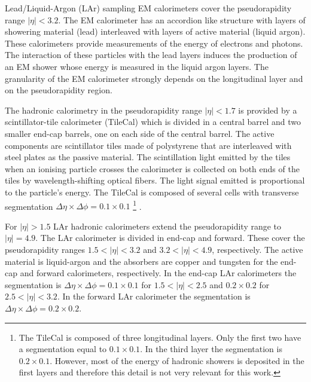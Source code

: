 Lead/Liquid-Argon (LAr) sampling EM calorimeters cover the pseudorapidity range $|\eta|<3.2$. The EM calorimeter has an accordion like structure with layers of showering material (lead) interleaved with layers of active material (liquid argon). These calorimeters provide measurements of the energy of electrons and photons. The interaction of these particles with the lead layers induces the production of an EM shower whose energy  is measured in the liquid argon layers. The granularity of the EM calorimeter strongly depends on the longitudinal layer and on the pseudorapidity region. 

The hadronic calorimetry in the pseudorapidity range $|\eta|<1.7$ is provided by a scintillator-tile calorimeter (TileCal) which is divided in a central barrel and two smaller end-cap barrels, one on each side of the central barrel. The active components are scintillator tiles made of polystyrene that are interleaved with steel plates as the passive material. The scintillation light emitted by the tiles when an ionising particle crosses the calorimeter is collected on both ends of the tiles by wavelength-shifting optical fibers. The light signal emitted is proportional to the particle's energy. The TileCal is composed of several cells with transverse segmentation $\Delta\eta\times\Delta\phi=0.1\times0.1$ \footnote{The TileCal is composed of three longitudinal layers. Only the first two have a segmentation equal to $0.1\times 0.1$. In the third layer the segmentation is $0.2\times 0.1$. However, most of the energy of hadronic showers is deposited in the first layers and therefore this detail is not very relevant for this work.} \cite{TileCalTech}. 

For $|\eta|>1.5$ LAr hadronic calorimeters extend the pseudorapidity range to $|\eta|=4.9$. The LAr calorimeter is divided in end-cap and forward. These cover the pseudorapidity ranges $1.5<|\eta|<3.2$ and $3.2<|\eta|<4.9$, respectively. The active material is liquid-argon and the absorbers are copper and tungsten for the end-cap and forward calorimeters, respectively. In the end-cap LAr calorimeters the segmentation is $\Delta\eta\times\Delta\phi= 0.1\times0.1$ for $1.5<|\eta|<2.5$ and $0.2\times0.2$ for $2.5<|\eta|<3.2$. In the forward LAr calorimeter the segmentation is $\Delta\eta\times\Delta\phi= 0.2\times0.2$. 

\renewcommand{\arraystretch}{1.2}

